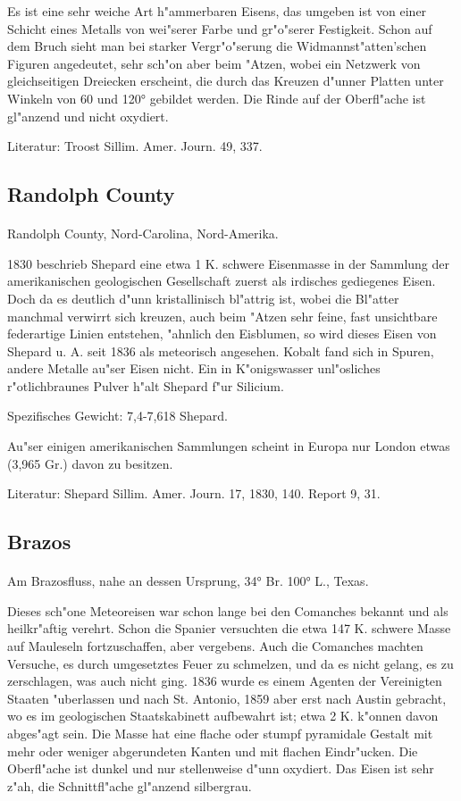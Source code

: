 \documentclass[a4paper, 11pt, oneside]{article}
\begin{document}
Es ist eine sehr weiche Art h"ammerbaren Eisens, das umgeben ist von einer Schicht eines Metalls von wei"serer Farbe und gr"o"serer Festigkeit. Schon auf dem Bruch sieht man bei starker Vergr"o"serung die Widmannst"atten'schen Figuren angedeutet, sehr sch"on aber beim "Atzen, wobei ein Netzwerk von gleichseitigen Dreiecken erscheint, die durch das Kreuzen d"unner Platten unter Winkeln von 60 und 120° gebildet werden. Die Rinde auf der Oberfl"ache ist gl"anzend und nicht oxydiert.

Literatur: Troost Sillim. Amer. Journ. 49, 337.

\subsection{Randolph County}
\normalsize
\paragraph{}
Randolph County, Nord-Carolina, Nord-Amerika.

1830 beschrieb Shepard eine etwa 1 K. schwere Eisenmasse in der Sammlung der amerikanischen geologischen Gesellschaft zuerst als irdisches gediegenes Eisen. Doch da es deutlich d"unn kristallinisch bl"attrig ist, wobei die Bl"atter manchmal verwirrt sich kreuzen, auch beim "Atzen sehr feine, fast unsichtbare federartige Linien entstehen, "ahnlich den Eisblumen, so wird dieses Eisen von Shepard u. A. seit 1836 als meteorisch angesehen. Kobalt fand sich in Spuren, andere Metalle au"ser Eisen nicht. Ein in K"onigswasser unl"osliches r"otlichbraunes Pulver h"alt Shepard f"ur Silicium.

Spezifisches Gewicht: 7,4-7,618 Shepard.

Au"ser einigen amerikanischen Sammlungen scheint in Europa nur London etwas (3,965 Gr.) davon zu besitzen.

Literatur: Shepard Sillim. Amer. Journ. 17, 1830, 140. Report 9, 31.

\subsection{Brazos}
\normalsize
\paragraph{}
Am Brazosfluss, nahe an dessen Ursprung, 34° Br. 100° L., Texas.

Dieses sch"one Meteoreisen war schon lange bei den Comanches bekannt und als heilkr"aftig verehrt. Schon die Spanier versuchten die etwa 147 K. schwere Masse auf Mauleseln fortzuschaffen, aber vergebens. Auch die Comanches machten Versuche, es durch umgesetztes Feuer zu schmelzen, und da es nicht gelang, es zu zerschlagen, was auch nicht ging. 1836 wurde es einem Agenten der Vereinigten Staaten "uberlassen und nach St. Antonio, 1859 aber erst nach Austin gebracht, wo es im geologischen Staatskabinett aufbewahrt ist; etwa 2 K. k"onnen davon abges"agt sein. Die Masse hat eine flache oder stumpf pyramidale Gestalt mit mehr oder weniger abgerundeten Kanten und mit flachen Eindr"ucken. Die Oberfl"ache ist dunkel und nur stellenweise d"unn oxydiert. Das Eisen ist sehr z"ah, die Schnittfl"ache gl"anzend silbergrau.
\end{document}
